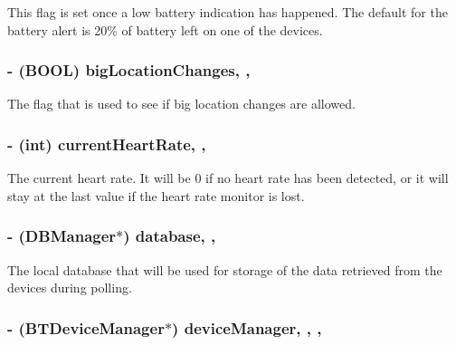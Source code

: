 This flag is set once a low battery indication has happened. The default for the battery alert is 20\% of battery left on one of the devices. \hypertarget{interface_device_poll_manager_a8186f40fc585c1bf30ebb8c6e05ca6d4}{
\subsubsection[{big\-Location\-Changes}]{\setlength{\rightskip}{0pt plus 5cm}-\/ (B\-O\-O\-L) big\-Location\-Changes\hspace{0.3cm}{\ttfamily [read]}, {\ttfamily [write]}, {\ttfamily [atomic]}}}\label{interface_device_poll_manager_a8186f40fc585c1bf30ebb8c6e05ca6d4}
The flag that is used to see if big location changes are allowed. \hypertarget{interface_device_poll_manager_a302b6434aa606031f78f721c9e40f0cf}{
\subsubsection[{current\-Heart\-Rate}]{\setlength{\rightskip}{0pt plus 5cm}-\/ (int) current\-Heart\-Rate\hspace{0.3cm}{\ttfamily [read]}, {\ttfamily [write]}, {\ttfamily [atomic]}}}\label{interface_device_poll_manager_a302b6434aa606031f78f721c9e40f0cf}
The current heart rate. It will be 0 if no heart rate has been detected, or it will stay at the last value if the heart rate monitor is lost. \hypertarget{interface_device_poll_manager_a66a02f95a478a42c7e45986317e3c6c1}{
\subsubsection[{database}]{\setlength{\rightskip}{0pt plus 5cm}-\/ ({\bf D\-B\-Manager}$\ast$) database\hspace{0.3cm}{\ttfamily [read]}, {\ttfamily [write]}, {\ttfamily [atomic]}}}\label{interface_device_poll_manager_a66a02f95a478a42c7e45986317e3c6c1}
The local database that will be used for storage of the data retrieved from the devices during polling. \hypertarget{interface_device_poll_manager_a813e014763804b71e247ca335fe91761}{
\subsubsection[{device\-Manager}]{\setlength{\rightskip}{0pt plus 5cm}-\/ ({\bf B\-T\-Device\-Manager}$\ast$) device\-Manager\hspace{0.3cm}{\ttfamily [read]}, {\ttfamily [write]}, {\ttfamily [atomic]}, {\ttfamily [retain]}}}\label{interface_device_poll_manager_a813e014763804b71e247ca335fe91761}
